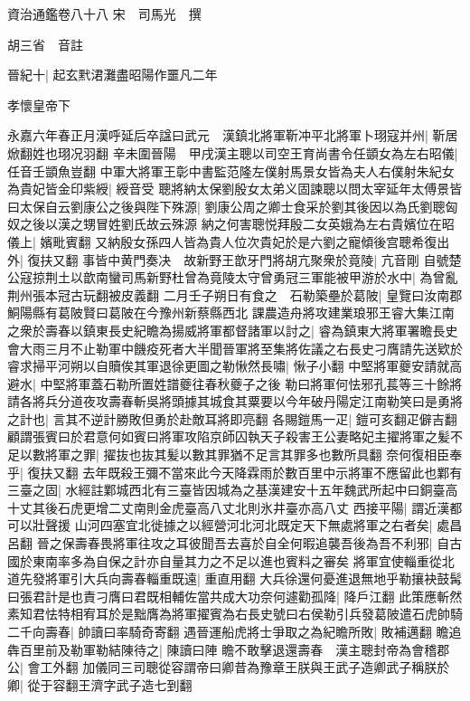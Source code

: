 資治通鑑卷八十八
宋　司馬光　撰

胡三省　音註

晉紀十|{
	起玄黓涒灘盡昭陽作噩凡二年}


孝懷皇帝下

永嘉六年春正月漢呼延后卒諡曰武元　漢鎮北將軍靳冲平北將軍卜珝寇并州|{
	靳居焮翻姓也珝况羽翻}
辛未圍晉陽　甲戌漢主聰以司空王育尚書令任顗女為左右昭儀|{
	任音壬顗魚豈翻}
中軍大將軍王彰中書監范隆左僕射馬景女皆為夫人右僕射朱紀女為貴妃皆金印紫綬|{
	綬音受}
聰將納太保劉殷女太弟义固諫聰以問太宰延年太傅景皆曰太保自云劉康公之後與陛下殊源|{
	劉康公周之卿士食采於劉其後因以為氏劉聰匈奴之後以漢之甥冒姓劉氏故云殊源}
納之何害聰悦拜殷二女英娥為左右貴嬪位在昭儀上|{
	嬪毗賓翻}
又納殷女孫四人皆為貴人位次貴妃於是六劉之寵傾後宫聰希復出外|{
	復扶又翻}
事皆中黄門奏决　故新野王歆牙門將胡亢聚衆於竟陵|{
	亢音剛}
自號楚公寇掠荆土以歆南蠻司馬新野杜曾為竟陵太守曾勇冠三軍能被甲游於水中|{
	為曾亂荆州張本冠古玩翻被皮義翻}
二月壬子朔日有食之　石勒築壘於葛陂|{
	皇覽曰汝南郡鮦陽縣有葛陂賢曰葛陂在今豫州新蔡縣西北}
課農造舟將攻建業琅邪王睿大集江南之衆於壽春以鎮東長史紀瞻為揚威將軍都督諸軍以討之|{
	睿為鎮東大將軍署瞻長史}
會大雨三月不止勒軍中饑疫死者大半聞晉軍將至集將佐議之右長史刁膺請先送欵於睿求掃平河朔以自贖俟其軍退徐更圖之勒愀然長嘯|{
	愀子小翻}
中堅將軍夔安請就高避水|{
	中堅將軍蓋石勒所置姓譜夔往春秋夔子之後}
勒曰將軍何怯邪孔萇等三十餘將請各將兵分道夜攻壽春斬吳將頭據其城食其粟要以今年破丹陽定江南勒笑曰是勇將之計也|{
	言其不逆計勝敗但勇於赴敵耳將即亮翻}
各賜鎧馬一疋|{
	鎧可亥翻疋僻吉翻}
顧謂張賓曰於君意何如賓曰將軍攻陷京師囚執天子殺害王公妻略妃主擢將軍之髪不足以數將軍之罪|{
	擢抜也抜其髪以數其罪猶不足言其罪多也數所具翻}
奈何復相臣奉乎|{
	復扶又翻}
去年既殺王彌不當來此今天降霖雨於數百里中示將軍不應留此也鄴有三臺之固|{
	水經註鄴城西北有三臺皆因城為之基漢建安十五年魏武所起中曰銅臺高十丈其後石虎更增二丈南則金虎臺高八丈北則氷井臺亦高八丈}
西接平陽|{
	謂近漢都可以壯聲援}
山河四塞宜北徙據之以經營河北河北既定天下無處將軍之右者矣|{
	處昌呂翻}
晉之保壽春畏將軍往攻之耳彼聞吾去喜於自全何暇追襲吾後為吾不利邪|{
	自古國於東南率多為自保之計亦自量其力之不足以進也賓料之審矣}
將軍宜使輜重從北道先發將軍引大兵向壽春輜重既遠|{
	重直用翻}
大兵徐還何憂進退無地乎勒攘袂鼓髯曰張君計是也責刁膺曰君既相輔佐當共成大功奈何遽勸孤降|{
	降戶江翻}
此策應斬然素知君怯特相宥耳於是黜膺為將軍擢賓為右長史號曰右侯勒引兵發葛陂遣石虎帥騎二千向壽春|{
	帥讀曰率騎奇寄翻}
遇晉運船虎將士爭取之為紀瞻所敗|{
	敗補邁翻}
瞻追犇百里前及勒軍勒結陳待之|{
	陳讀曰陣}
瞻不敢擊退還壽春　漢主聰封帝為會稽郡公|{
	會工外翻}
加儀同三司聰從容謂帝曰卿昔為豫章王朕與王武子造卿武子稱朕於卿|{
	從于容翻王濟字武子造七到翻}
